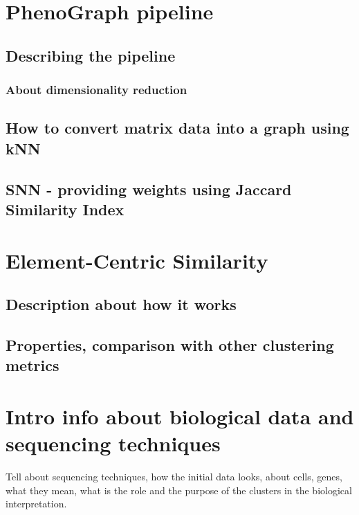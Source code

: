 \section{PhenoGraph pipeline}
\subsection{Describing the pipeline}
\subsubsection{About dimensionality reduction}
\subsection{How to convert matrix data into a graph using kNN}
\subsection{SNN - providing weights using Jaccard Similarity Index}

\section{Element-Centric Similarity}
\subsection{Description about how it works}
\subsection{Properties, comparison with other clustering metrics}

\section{Intro info about biological data and sequencing techniques}
Tell about sequencing techniques, how the initial data looks, about cells, genes, what they mean, what is the role and the purpose of the clusters in the biological interpretation.